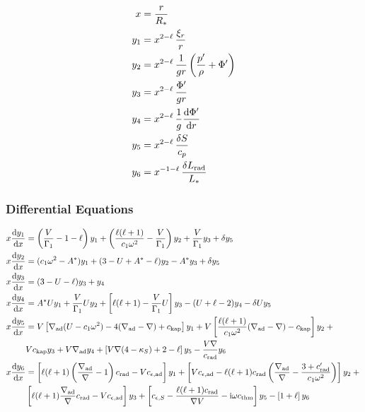 \documentclass[fleqn]{article}
\newcommand{\diff}{\ensuremath{\mathrm{d}}}
\newcommand{\ii}{\ensuremath{\mathrm{i}}}
\newcommand{\Vg}{\ensuremath{\frac{V}{\Gamma_{1}}}}
\newcommand{\As}{\ensuremath{A^{\ast}}}
\newcommand{\nabad}{\ensuremath{\nabla_{\rm ad}}}
\newcommand{\kapS}{\ensuremath{\kappa_{S}}}
\newcommand{\crad}{\ensuremath{c_{\rm rad}}}
\newcommand{\cepsad}{\ensuremath{c_{\epsilon,{\rm ad}}}}
\newcommand{\cepsS}{\ensuremath{c_{\epsilon,S}}}
\newcommand{\cthm}{\ensuremath{c_{\rm thm}}}
\newcommand{\ckap}{\ensuremath{c_{\rm kap}}}
\newcommand{\Rstar}{\ensuremath{R_{\ast}}}
\newcommand{\Lrad}{\ensuremath{L_{\rm rad}}}
\newcommand{\Lstar}{\ensuremath{L_{\ast}}}
\begin{document}
\begin{align*}
x     &= \frac{r}{\Rstar} \\
y_{1} &= x^{2-\ell}\, \frac{\xi_{r}}{r} \\
y_{2} &= x^{2-\ell}\, \frac{1}{gr} \left( \frac{p'}{\rho} + \Phi' \right)\\
y_{3} &= x^{2-\ell}\, \frac{\Phi'}{gr}\\
y_{4} &= x^{2-\ell}\, \frac{1}{g} \frac{\diff \Phi'}{\diff r}\\
y_{5} &= x^{2-\ell}\, \frac{\delta S}{c_{p}}\\
y_{6} &= x^{-1-\ell}\, \frac{\delta \Lrad}{\Lstar}
\end{align*}

\subsubsection*{Differential Equations}

\begin{align*}
x \frac{\diff y_{1}}{\diff x} &=
\left(\Vg - 1 - \ell \right) y_{1} +
\left(\frac{\ell(\ell+1)}{c_{1} \omega^{2}} - \Vg \right) y_{2} +
\Vg y_{3} +
\delta y_{5} \\
x \frac{\diff y_{2}}{\diff x} &=
(c_{1} \omega^{2} - \As ) y_{1} +
(3 - U + \As - \ell) y_{2} -
\As y_{3} +
\delta y_{5} \\
x \frac{\diff y_{3}}{\diff x} &=
(3 - U - \ell) y_{3} +
y_{4} \\
x \frac{\diff y_{4}}{\diff x} &=
\As U y_{1} +
\Vg U y_{2} +
\left[ \ell(\ell+1) - \Vg U \right] y_{3} -
(U + \ell - 2) y_{4}
- \delta U y_{5} \\
x \frac{\diff y_{5}}{\diff x} &=
V \left[ \nabad (U - c_{1}\omega^{2}) - 4 (\nabad - \nabla) + \ckap \right] y_{1} + 
V \left[ \frac{\ell(\ell+1)}{c_{1} \omega^{2}} (\nabad - \nabla) - \ckap \right] y_{2} + \mbox{} \\
& 
V \ckap y_{3} + 
V \nabad y_{4} + 
\left[ V \nabla (4 - \kapS) + 2 - \ell \right] y_{5} -
\frac{V \nabla}{\crad} y_{6} \\
x \frac{\diff y_{6}}{\diff x} &=
\left[ \ell(\ell+1)\left( \frac{\nabad}{\nabla} - 1 \right) \crad - V \cepsad \right] y_{1} +
\left[ V \cepsad - \ell(\ell+1)\crad \left( \frac{\nabad}{\nabla} - \frac{3 + \crad'}{c_{1}\omega^{2}} \right) \right] y_{2} + \mbox{} \\
&
\left[ \ell(\ell+1) \frac{\nabad}{\nabla} \crad - V \cepsad \right] y_{3} +
\left[ \cepsS - \frac{\ell(\ell+1)\crad}{\nabla V} - \ii \omega \cthm\right] y_{5} -
\left[ 1 + \ell \right] y_{6}
\end{align*}
\end{document}
